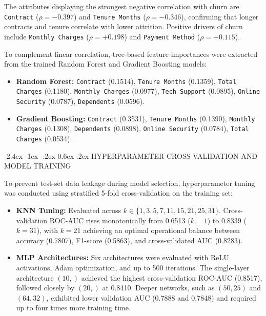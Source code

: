 \documentclass[12pt,oneside]{report}
\makeatletter
\renewcommand{\section}{\@startsection{section}{1}{\z@}%
  {-2.4ex \@plus -1ex \@minus -.2ex}%
  {0.6ex \@plus .2ex}%
  {\normalfont\large\bfseries}}
\makeatother
\begin{document}
The attributes displaying the strongest negative correlation with churn are \texttt{Contract} ($\rho = -0.397$) and \texttt{Tenure Months} ($\rho = -0.346$), confirming that longer contracts and tenure correlate with lower attrition. Positive drivers of churn include \texttt{Monthly Charges} ($\rho = +0.198$) and \texttt{Payment Method} ($\rho = +0.115$).

To complement linear correlation, tree-based feature importances were extracted from the trained Random Forest and Gradient Boosting models:
\begin{itemize}
    \item \textbf{Random Forest:} \texttt{Contract} (0.1514), \texttt{Tenure Months} (0.1359), \texttt{Total Charges} (0.1180), \texttt{Monthly Charges} (0.0977), \texttt{Tech Support} (0.0895), \texttt{Online Security} (0.0787), \texttt{Dependents} (0.0596).
    \item \textbf{Gradient Boosting:} \texttt{Contract} (0.3531), \texttt{Tenure Months} (0.1390), \texttt{Monthly Charges} (0.1308), \texttt{Dependents} (0.0898), \texttt{Online Security} (0.0784), \texttt{Total Charges} (0.0534).
\end{itemize}

\section{HYPERPARAMETER CROSS-VALIDATION AND MODEL TRAINING}

To prevent test-set data leakage during model selection, hyperparameter tuning was conducted using stratified 5-fold cross-validation on the training set:
\begin{itemize}
    \item \textbf{KNN Tuning:} Evaluated across $k \in \{1, 3, 5, 7, 11, 15, 21, 25, 31\}$. Cross-validation ROC-AUC rises monotonically from 0.6513 ($k=1$) to 0.8339 ($k=31$), with $k=21$ achieving an optimal operational balance between accuracy (0.7807), F1-score (0.5863), and cross-validated AUC (0.8283).
    \item \textbf{MLP Architectures:} Six architectures were evaluated with ReLU activations, Adam optimization, and up to 500 iterations. The single-layer architecture $(10,)$ achieved the highest cross-validation ROC-AUC (0.8517), followed closely by $(20,)$ at 0.8410. Deeper networks, such as $(50, 25)$ and $(64, 32)$, exhibited lower validation AUC (0.7888 and 0.7848) and required up to four times more training time.
\end{itemize}
\end{document}
